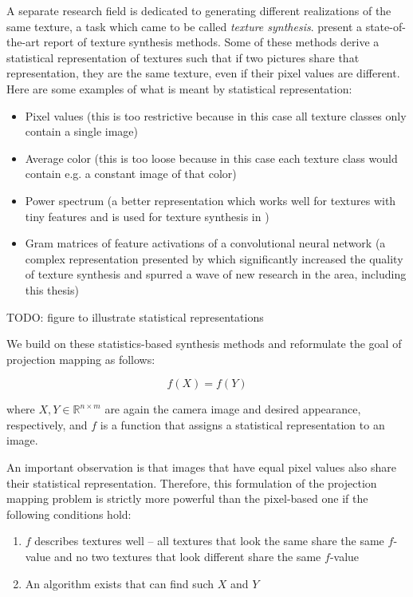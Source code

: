 A separate research field is dedicated to generating different realizations of the same texture, a task which came to be called \textit{texture synthesis}. \citet*{Raad2018} present a state-of-the-art report of texture synthesis methods. Some of these methods derive a statistical representation of textures such that if two pictures share that representation, they are the same texture, even if their pixel values are different. Here are some examples of what is meant by statistical representation:

\begin{itemize}
    \item Pixel values (this is too restrictive because in this case all texture classes only contain a single image)
    \item Average color (this is too loose because in this case each texture class would contain e.g. a constant image of that color)
    \item Power spectrum (a better representation which works well for textures with tiny features and is used for texture synthesis in \citet*{Galerne2011})
    \item Gram matrices of feature activations of a convolutional neural network (a complex representation presented by \citet*{Gatys2015} which significantly increased the quality of texture synthesis and spurred a wave of new research in the area, including this thesis)
\end{itemize}

{\color{red} TODO: figure to illustrate statistical representations}

We build on these statistics-based synthesis methods and reformulate the goal of projection mapping as follows:

\begin{equation}
    \label{eq:projection_mapping-statistics}
    f(X) = f(Y)
\end{equation}

where \(X,Y \in \mathbb{R}^{n \times m}\) are again the camera image and desired appearance, respectively, and \(f\) is a function that assigns a statistical representation to an image.

An important observation is that images that have equal pixel values also share their statistical representation. Therefore, this formulation of the projection mapping problem is strictly more powerful than the pixel-based one if the following conditions hold:

\begin{enumerate}
    \item \(f\) describes textures well -- all textures that look the same share the same \(f\)-value and no two textures that look different share the same \(f\)-value
    \item An algorithm exists that can find such \(X\) and \(Y\)
\end{enumerate}

